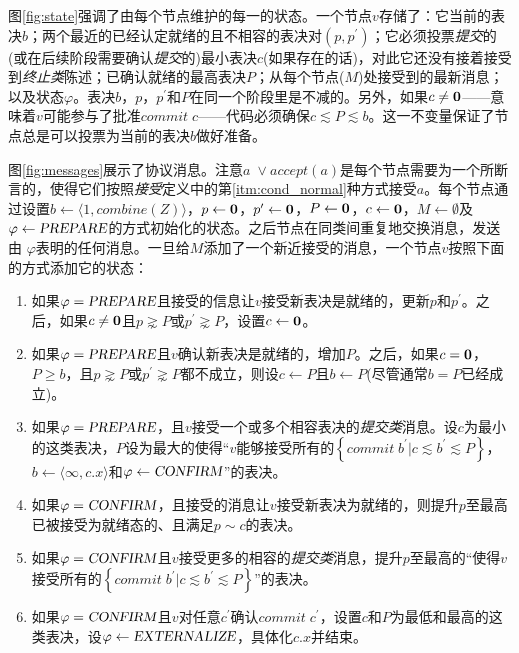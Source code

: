 {图\ref{fig:state}}强调了由每个节点维护的每一{\slot}的状态。一个节点$v$存储了：它当前的表决$b$；两个最近的已经认定就绪的且不相容的表决对$(p,p^{\prime})$；它必须投票\textit{提交}的(或在后续阶段需要确认\textit{提交}的)最小表决$c$(如果存在的话)，对此它还没有接着接受到\textit{终止类}陈述；已确认就绪的最高表决$P$；从每个节点($M$)处接受到的最新消息；以及状态$\varphi$。表决$b$，$p$，$p^{\prime}$和$P$在同一个阶段里是不减的。另外，如果$c\neq{\bm 0}$——意味着$v$可能参与了批准$commit\;c$——代码必须确保$c\lesssim P\lesssim b$。这一不变量保证了节点总是可以投票为当前的表决$b$做好准备。

{图\ref{fig:messages}}展示了协议消息。注意$a\;\vee accept(a)$是每个节点需要为一个{\quorum}所断言的，使得它们按照\textit{接受}定义中的第\ref{itm:cond_normal}种方式接受$a$。每个节点通过设置$b\leftarrow \langle 1,combine(Z)\rangle$，$p\leftarrow {\bm 0}$，$p^{\prime}\leftarrow {\bm 0}$，$P\leftarrow {\bm 0}$，$c\leftarrow {\bm 0}$，$M\leftarrow\emptyset$及$\varphi \leftarrow \textsl{PREPARE}$的方式初始化{\slot}的状态。之后节点在同类间重复地交换消息，发送由 $\varphi$表明的任何消息。一旦给$M$添加了一个新近接受的消息，一个节点$v$按照下面的方式添加它的状态：

\begin{enumerate}\label{protocal_case}
	\item 如果$\varphi = \textsl{PREPARE}$且接受的信息让$v$接受新表决是就绪的，更新$p$和$p^{\prime}$。之后，如果$c\neq {\bm 0}$且$p\gnsim P$或$p^{\prime}\gnsim P$，设置$c\leftarrow {\bm 0}$。
	\item 如果$\varphi = \textsl{PREPARE}$且$v$确认新表决是就绪的，增加$P$。之后，如果$c={\bm 0}$，$P\geq b$，且$p\gnsim P$或$p^{\prime}\gnsim P$都不成立，则设$c\leftarrow P$且$b\leftarrow P$(尽管通常$b=P$已经成立)。
	\item 如果$\varphi = \textsl{PREPARE}$，且$v$接受一个或多个相容表决的\textit{提交类}消息。设$c$为最小的这类表决，$P$设为最大的使得``$v$能够接受所有的$\left\{commit\;b^{\prime}|c\lesssim b^{\prime}\lesssim P\right\}$，$b\leftarrow \langle \infty, c.x\rangle$和$\varphi\leftarrow \textsl{CONFIRM}$''的表决。
	\item 如果$\varphi = \textsl{CONFIRM}$，且接受的消息让$v$接受新表决为就绪的，则提升$p$至最高已被接受为就绪态的、且满足$p\sim c$的表决。
	\item 如果$\varphi = \textsl{CONFIRM}$且$v$接受更多的相容的\textit{提交类}消息，提升$p$至最高的``使得$v$接受所有的$\left\{commit\;b^{\prime}|c\lesssim b^{\prime} \lesssim P\right\}$''的表决。
	\item 如果$\varphi = \textsl{CONFIRM}$且$v$对任意$c^{\prime}$确认$commit\;c^{\prime}$，设置$c$和$P$为最低和最高的这类表决，设$\varphi\leftarrow\textsl{EXTERNALIZE}$，具体化$c.x$并结束。
\end{enumerate}

